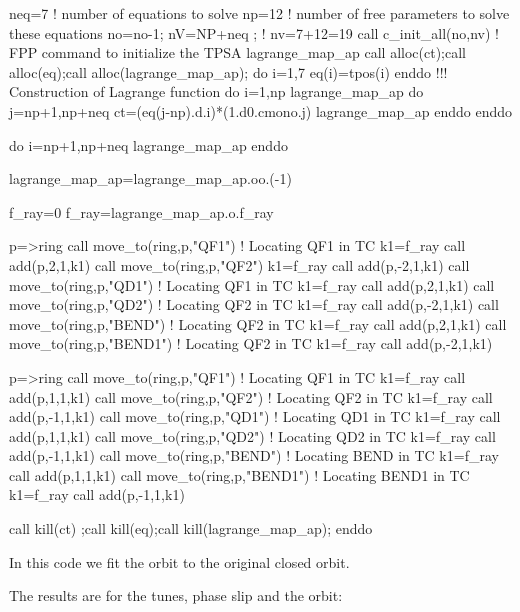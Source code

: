 \documentclass{hitec}     %
\begin{document}
{{{{{{\begin{code}
neq=7    ! number of equations to solve
np=12     ! number of free parameters to solve these equations
no=no-1; nV=NP+neq ;  ! nv=7+12=19
call c_init_all(no,nv)   ! FPP command to initialize the TPSA
lagrange_map_ap%
call alloc(ct);call alloc(eq);call alloc(lagrange_map_ap);
do i=1,7
 eq(i)=tpos(i)
enddo
!!!  Construction of Lagrange function
do i=1,np
 lagrange_map_ap%
 do j=np+1,np+neq 
  ct=(eq(j-np).d.i)*(1.d0.cmono.j)
   lagrange_map_ap%
 enddo         
enddo 
 
do i=np+1,np+neq 
 lagrange_map_ap%
enddo 

lagrange_map_ap=lagrange_map_ap.oo.(-1)

f_ray=0
f_ray=lagrange_map_ap.o.f_ray

p=>ring%
call move_to(ring,p,"QF1")   !  Locating QF1 in TC
 k1=f_ray%
 call add(p,2,1,k1)
call move_to(ring,p,"QF2") 
 k1=f_ray%
 call add(p,-2,1,k1)
call move_to(ring,p,"QD1")   !  Locating QF1 in TC
 k1=f_ray%
 call add(p,2,1,k1)
call move_to(ring,p,"QD2")   !  Locating QF2 in TC
 k1=f_ray%
 call add(p,-2,1,k1)
call move_to(ring,p,"BEND")   !  Locating QF2 in TC
 k1=f_ray%
 call add(p,2,1,k1)
call move_to(ring,p,"BEND1")   !  Locating QF2 in TC
 k1=f_ray%
 call add(p,-2,1,k1)

p=>ring%
call move_to(ring,p,"QF1")   !  Locating QF1 in TC
 k1=f_ray%
 call add(p,1,1,k1)
call move_to(ring,p,"QF2")   ! Locating QF2 in TC
 k1=f_ray%
 call add(p,-1,1,k1)
call move_to(ring,p,"QD1")     !  Locating QD1 in TC
 k1=f_ray%
 call add(p,1,1,k1)
call move_to(ring,p,"QD2")     !  Locating QD2 in TC
 k1=f_ray%
 call add(p,-1,1,k1)
call move_to(ring,p,"BEND")     !  Locating BEND in TC
 k1=f_ray%
 call add(p,1,1,k1)
call move_to(ring,p,"BEND1")    !  Locating BEND1 in TC
 k1=f_ray%
 call add(p,-1,1,k1)

call kill(ct) ;call kill(eq);call kill(lagrange_map_ap);
enddo
\end{code}
\renewcommand{\codefont}{\small}

In this code we fit the orbit to the original closed orbit. 

The results are for the tunes, phase slip and the orbit:

}}}}}}
\end{document}

